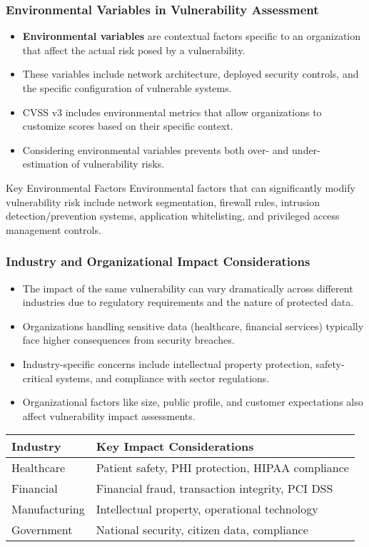 \documentclass{beamer}
\begin{document}
\begin{frame}
\frametitle{Environmental Variables in Vulnerability Assessment}
\begin{itemize}
\item \textbf{Environmental variables} are contextual factors specific to an organization that affect the actual risk posed by a vulnerability.
\item These variables include network architecture, deployed security controls, and the specific configuration of vulnerable systems.
\item CVSS v3 includes environmental metrics that allow organizations to customize scores based on their specific context.
\item Considering environmental variables prevents both over- and under-estimation of vulnerability risks.
\end{itemize}

\begin{alertblock}{Key Environmental Factors}
\scriptsize
Environmental factors that can significantly modify vulnerability risk include network segmentation, firewall rules, intrusion detection/prevention systems, application whitelisting, and privileged access management controls.
\end{alertblock}
\end{frame}

\begin{frame}
\frametitle{Industry and Organizational Impact Considerations}
\begin{itemize}
\item The impact of the same vulnerability can vary dramatically across different industries due to regulatory requirements and the nature of protected data.
\item Organizations handling sensitive data (healthcare, financial services) typically face higher consequences from security breaches.
\item Industry-specific concerns include intellectual property protection, safety-critical systems, and compliance with sector regulations.
\item Organizational factors like size, public profile, and customer expectations also affect vulnerability impact assessments.
\end{itemize}

\begin{table}
\scriptsize
\centering
\begin{tabular}{p{3cm}p{8cm}}
\toprule
\textbf{Industry} & \textbf{Key Impact Considerations} \\
\midrule
Healthcare & Patient safety, PHI protection, HIPAA compliance \\
Financial & Financial fraud, transaction integrity, PCI DSS \\
Manufacturing & Intellectual property, operational technology \\
Government & National security, citizen data, compliance \\
\bottomrule
\end{tabular}
\end{table}
\end{frame}
\end{document}
